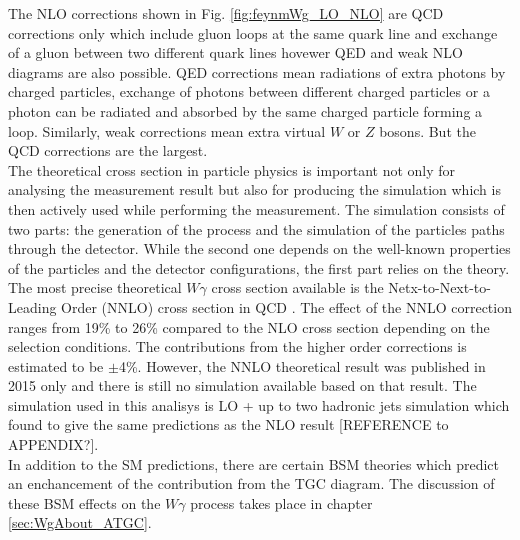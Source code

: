 The NLO corrections shown in Fig. \ref{fig:feynmWg_LO_NLO} are QCD corrections only which include gluon loops at the same quark line and exchange of a gluon between two different quark lines hovewer QED and weak NLO diagrams are also possible. QED corrections mean radiations of extra photons by charged particles, exchange of photons between different charged particles or a photon can be radiated and absorbed by the same charged particle forming a loop. Similarly, weak corrections mean extra virtual $W$ or $Z$ bosons. But the QCD corrections are the largest.\\

The theoretical cross section in particle physics is important not only for analysing the measurement result but also for producing the simulation which is then actively used while performing the measurement. The simulation consists of two parts: the generation of the process and the simulation of the particles paths through the detector. While the second one depends on the well-known properties of the particles and the detector configurations, the first part relies on the theory.\\

The most precise theoretical $W\gamma$ cross section available is the Netx-to-Next-to-Leading Order (NNLO) cross section in QCD \cite{ref_theory_NNLO}. The effect of the NNLO correction ranges from 19\% to 26\% compared to the NLO cross section depending on the selection conditions. The contributions from the higher order corrections is estimated to be $\pm$4\%. However, the NNLO theoretical result was published in 2015 only and there is still no simulation available based on that result. The simulation used in this analisys is LO + up to two hadronic jets simulation which found to give the same predictions as the NLO result [REFERENCE to APPENDIX?].\\

In addition to the SM predictions, there are certain BSM theories which predict an enchancement of the contribution from the TGC diagram. The discussion of these BSM effects on the $W\gamma$ process takes place in chapter \ref{sec:WgAbout_ATGC}.\\ 


